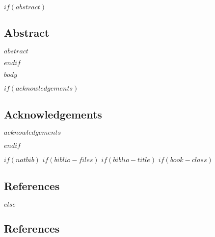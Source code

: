 \documentclass[final]{beamer}
\title
\author{ %
$if(author)$
$for(author)$
$author.name$\inst{$author.affiliation-label$}$sep$ \and $endfor$
$endif$
}
\institute{
$for(author)$
\inst{$author.affiliation-label$} $author.affiliation$
$endfor$
}
\date{$date$}
\begin{document}
\begin{frame}[t]
\begin{multicols}{2}


$if(abstract)$
\subsection{Abstract}

$abstract$

$endif$





$body$



$if(acknowledgements)$
\subsection{Acknowledgements}

$acknowledgements$

$endif$



$if(natbib)$
$if(biblio-files)$
$if(biblio-title)$
$if(book-class)$
\subsection{References}

\renewcommand\bibname{$biblio-title$}
$else$
\subsection{References}


\end{multicols}
\end{frame}
\end{document}
